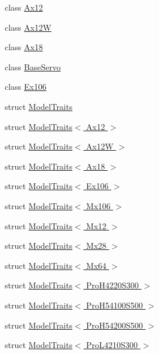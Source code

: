 \begin{DoxyCompactItemize}
\item 
class \hyperlink{classdynamixel_1_1servos_1_1_ax12}{Ax12}
\item 
class \hyperlink{classdynamixel_1_1servos_1_1_ax12_w}{Ax12W}
\item 
class \hyperlink{classdynamixel_1_1servos_1_1_ax18}{Ax18}
\item 
class \hyperlink{classdynamixel_1_1servos_1_1_base_servo}{Base\+Servo}
\item 
class \hyperlink{classdynamixel_1_1servos_1_1_ex106}{Ex106}
\item 
struct \hyperlink{structdynamixel_1_1servos_1_1_model_traits}{Model\+Traits}
\item 
struct \hyperlink{structdynamixel_1_1servos_1_1_model_traits_3_01_ax12_01_4}{Model\+Traits$<$ Ax12 $>$}
\item 
struct \hyperlink{structdynamixel_1_1servos_1_1_model_traits_3_01_ax12_w_01_4}{Model\+Traits$<$ Ax12\+W $>$}
\item 
struct \hyperlink{structdynamixel_1_1servos_1_1_model_traits_3_01_ax18_01_4}{Model\+Traits$<$ Ax18 $>$}
\item 
struct \hyperlink{structdynamixel_1_1servos_1_1_model_traits_3_01_ex106_01_4}{Model\+Traits$<$ Ex106 $>$}
\item 
struct \hyperlink{structdynamixel_1_1servos_1_1_model_traits_3_01_mx106_01_4}{Model\+Traits$<$ Mx106 $>$}
\item 
struct \hyperlink{structdynamixel_1_1servos_1_1_model_traits_3_01_mx12_01_4}{Model\+Traits$<$ Mx12 $>$}
\item 
struct \hyperlink{structdynamixel_1_1servos_1_1_model_traits_3_01_mx28_01_4}{Model\+Traits$<$ Mx28 $>$}
\item 
struct \hyperlink{structdynamixel_1_1servos_1_1_model_traits_3_01_mx64_01_4}{Model\+Traits$<$ Mx64 $>$}
\item 
struct \hyperlink{structdynamixel_1_1servos_1_1_model_traits_3_01_pro_h4220_s300_01_4}{Model\+Traits$<$ Pro\+H4220\+S300 $>$}
\item 
struct \hyperlink{structdynamixel_1_1servos_1_1_model_traits_3_01_pro_h54100_s500_01_4}{Model\+Traits$<$ Pro\+H54100\+S500 $>$}
\item 
struct \hyperlink{structdynamixel_1_1servos_1_1_model_traits_3_01_pro_h54200_s500_01_4}{Model\+Traits$<$ Pro\+H54200\+S500 $>$}
\item 
struct \hyperlink{structdynamixel_1_1servos_1_1_model_traits_3_01_pro_l4210_s300_01_4}{Model\+Traits$<$ Pro\+L4210\+S300 $>$}

\end{DoxyCompactItemize}
